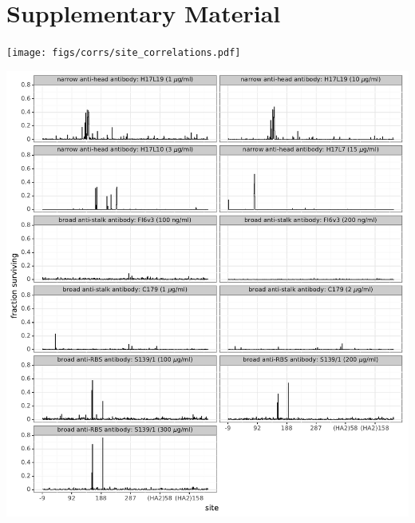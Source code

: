 \documentclass[11pt]{article}
\begin{document}
\section*{Supplementary Material}
\FloatBarrier
{}%
\renewcommand*{\thepage}{S\arabic{page}}

\begin{suppfigure}
\centerline{\texttt{[image: figs/corrs/site\_correlations.pdf]}}
\caption{\label{suppfig:corr}
{\bf Correlations across experimental replicates.} 
Each point represents one site in HA, and gives the fraction surviving above average across all amino-acid mutations at that site, as calculated using Equation~\ref{eq:avgfracsurvive}.
The replicates are highly correlated for antibodies with strong escape mutations (S139/1, H17-L19, H17-L10, and H17-L7), and reasonably correlated for antibodies with only weak escape mutations (FI6v3 and C179).
}
\end{suppfigure}

\begin{suppfigure}
\centerline{\includegraphics[width=\textwidth]{figs/maxfracsurvive.pdf}}
\caption{\label{suppfig:maxfracsurvive}
{\bf The excess fraction surviving for the single strongest escape mutation at each site.}
This plot differs from Figure~\ref{fig:avgfracsurvive} in that the height of the line indicates the excess fraction of virions that survive the antibody selection for the single strongest escape mutation at that site, rather than the average across all amino-acid mutations at that site.
}
\end{suppfigure}
\end{document}

